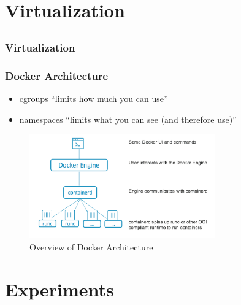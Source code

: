 \documentclass{beamer}
\begin{document}
\section{Virtualization}
\subsection{}
\begin{frame}
  \frametitle{Virtualization}
  
\end{frame}

\begin{frame}
  \frametitle{Docker Architecture}
  \begin{itemize}
    \item cgroups ``limits how much you can use''
    \item namespaces ``limits what you can see (and therefore use)''
  \end{itemize}
  \begin{figure}[h!]
    \centering
    \includegraphics[width=8cm]{../tex/figure/dockerarchblog}
    \caption{Overview of Docker Architecture}
    \label{fig:arch}
  \end{figure}
\end{frame}

\section{Experiments}
\end{document}
